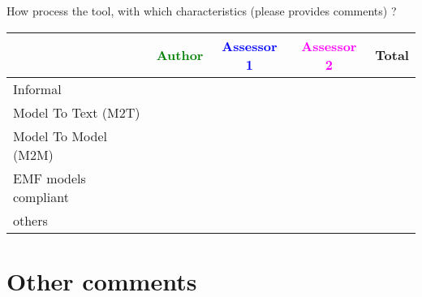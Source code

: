 How process the tool, with which characteristics (please provides comments) ? 


\begin{tabular}{|l | c | c | c | c|}
\hline
& \textcolor{green}{Author} & \textcolor{blue}{Assessor 1} & \textcolor{magenta}{Assessor 2} & Total \\
\hline 
Informal & & & &  \\
\hline
Model To Text (M2T) & & & & \\
\hline
Model To Model (M2M) & & & & \\
\hline
EMF models compliant & & & & \\
\hline
others & & & & \\
\hline
\end{tabular}


\section{Other comments}



\begin{comment}
This section is available for the author or the assessors to  complete the description and criteria.
\end{comment}



